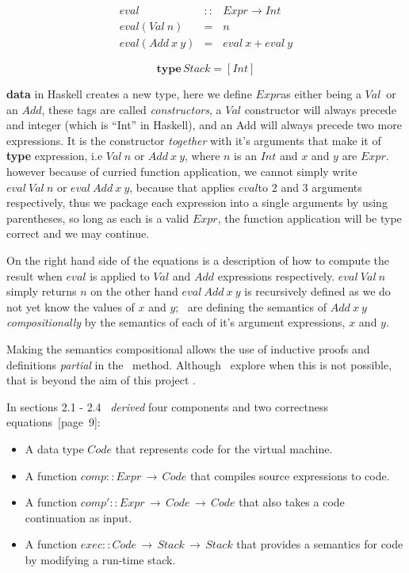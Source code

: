 \documentclass {article}
\begin{document}
\newcommand{\eval}{$eval$}
\newcommand{\expr}{$Expr$}
\newcommand{\val}{$Val$}
\newcommand{\add}{$Add$}
\newcommand{\code}{$Code$}

\begin{eqnarray*}
	 eval &::& Expr \rightarrow Int \\ 
	 eval (Val \  n) &=& n \\
	 eval (Add \  x \  y) &=& eval \  x + eval \  y 
\end{eqnarray*}

	\[ \textbf{type} \, Stack = [Int]\]

\textbf{data} in Haskell creates a new type,
here we define \expr as either being a \val\
or an \add, these tags are called \emph{constructors},
a $Val$ constructor will always precede and integer
(which is ``Int'' in Haskell),
and an Add will always precede two more expressions.
It is the constructor \emph{together} with 
it's arguments that make it of \textbf{type}
expression, i.e $Val \ n$ or $Add \ x \ y$,
where $n$ is an $Int$ and $x$ and $y$ are $Expr$.
however because of curried function application,
we cannot simply write 
$eval \ Val \ n$ or $eval \ Add \ x \ y$,
because that applies \eval to 2 and 3 arguments respectively,
thus we package each expression into a single arguments
by using parentheses, so long as each is a
valid \expr, the function application will be type correct
and we may continue.

On the right hand side of the equations is a
description of how to compute 
the result when $eval$ is applied to $Val$ and
$Add$ expressions respectively.
$eval \ Val \ n$ simply returns $n$
on the other hand $eval \ Add \ x \ y$
is recursively defined as we do not yet know
the values of $x$ and $y$; \BH\ are defining the
semantics of $Add \ x \ y$ \emph{compositionally} by the 
semantics of each of it's argument expressions, $x$ and $y$.

Making the semantics compositional allows
the use of inductive proofs and definitions \emph{partial}
in the \BH\ method.
Although \BH\ explore
when this is not possible, that is beyond
the aim of this project \cite{bandh}.

In sections 2.1 - 2.4 \BH\
\emph{derived} four 
components and two correctness equations\cite{bandh}~[page~9]:

\begin{itemize}
	\item A data type $Code$ that represents
		code for the virtual machine.
	\item A function \( comp::Expr \, \rightarrow \, Code \)
		that compiles source expressions to code.
	\item A function 
		\( comp'::Expr \, \rightarrow \, Code \, \rightarrow \, Code \)
		that also takes a code continuation as input.
	\item A function
		\( exec::Code \, \rightarrow \, Stack \, \rightarrow \, Stack \)
		that provides a semantics for code by modifying a run-time stack.
\end{itemize}
\end{document}
